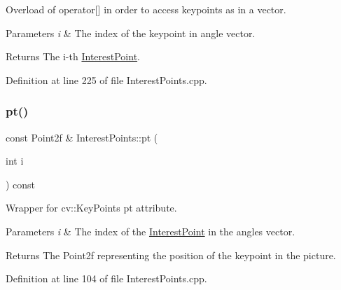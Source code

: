 Overload of operator\mbox{[}\mbox{]} in order to access keypoints as in a vector.


\begin{DoxyParams}{Parameters}
{\em i} & The index of the keypoint in angle vector.\\
\hline
\end{DoxyParams}
\begin{DoxyReturn}{Returns}
The i-\/th \hyperlink{classdefals_1_1_interest_point}{Interest\+Point}. 
\end{DoxyReturn}


Definition at line 225 of file Interest\+Points.\+cpp.

\mbox{\label{classdefals_1_1_interest_points_ab9c31f421438b096df5447d6ce1b02f4}} 
\subsubsection{\texorpdfstring{pt()}{pt()}}
{\footnotesize\ttfamily const Point2f \& Interest\+Points\+::pt (\begin{DoxyParamCaption}\item[{int}]{i }\end{DoxyParamCaption}) const}

Wrapper for cv\+::\+Key\+Point\textquotesingle{}s pt attribute.


\begin{DoxyParams}{Parameters}
{\em i} & The index of the \hyperlink{classdefals_1_1_interest_point}{Interest\+Point} in the angles vector.\\
\hline
\end{DoxyParams}
\begin{DoxyReturn}{Returns}
The Point2f representing the position of the keypoint in the picture. 
\end{DoxyReturn}


Definition at line 104 of file Interest\+Points.\+cpp.

\mbox{\label{classdefals_1_1_interest_points_ac7953a26838e4b9ceb0546e6ace5f161}} 
